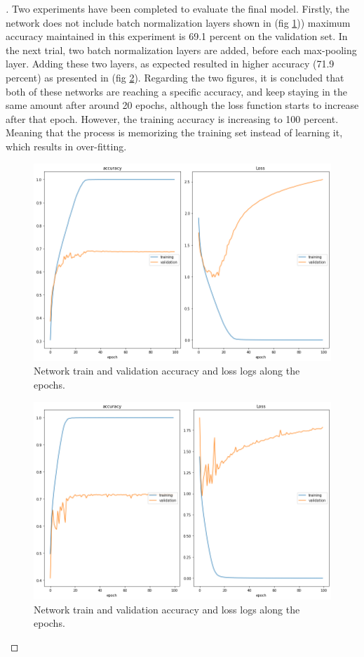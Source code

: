 \documentclass[12pt,oneside,geqno]{article}
\begin{document}
\begin{proof}[\color{red}{Solution}]
		Two experiments have been completed to evaluate the final model. Firstly, the network does not include batch normalization layers shown in (fig \ref{img:q1_log})) maximum accuracy maintained in this experiment is 69.1 percent on the validation set. In the next trial, two batch normalization layers are added, before each max-pooling layer. Adding these two layers, as expected resulted in higher accuracy (71.9 percent) as presented in (fig \ref{img:q1_log_batch}). Regarding the two figures, it is concluded that both of these networks are reaching a specific accuracy, and keep staying in the same amount after around 20 epochs, although the loss function starts to increase after that epoch. However, the training accuracy is increasing to 100 percent. Meaning that the process is memorizing the training set instead of learning it, which results in over-fitting. 
		\begin{figure}
			\centering
			\includegraphics[width=\textwidth]{../figs/q1_acc, loss.png}
			\caption{Network train and validation accuracy and loss logs along the epochs.}
			\label{img:q1_log}
		\end{figure}
		
		\begin{figure}
			\centering
			\includegraphics[width=\textwidth]{../figs/q1_acc, loss_batchnormalization.png}
			\caption{Network train and validation accuracy and loss logs along the epochs.}
			\label{img:q1_log_batch}
		\end{figure}

\end{proof}
\end{document}
